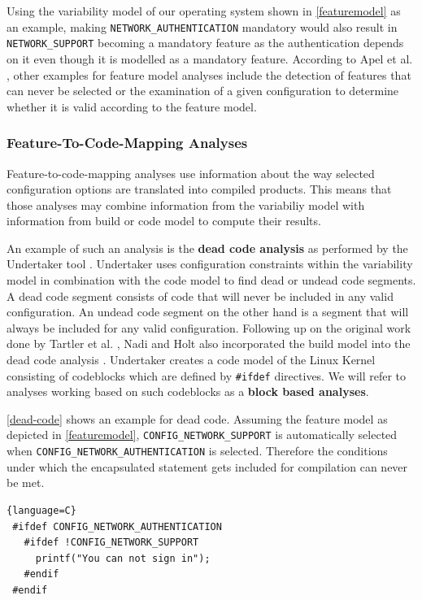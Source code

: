 \documentclass[a4paper]{article}
\begin{document}
Using the variability model of our operating system shown in \autoref{featuremodel} as an example, making \texttt{NETWORK\_AUTHENTICATION} mandatory would also result in \texttt{NETWORK\_SUPPORT} becoming a mandatory feature as the authentication depends on it even though it is modelled as a mandatory feature.  According to Apel et al. \cite{Apel:2013:FSP:2541773}, other examples for feature model analyses include the detection of features that can never be selected or the examination of a given configuration to determine whether it is valid according to the feature model.

\subsubsection{Feature-To-Code-Mapping Analyses}\label{feature-code-mapping}

Feature-to-code-mapping analyses use information about the way selected configuration options are translated into compiled products. This means that those analyses may combine information from the variabiliy model with information from build or code model to compute their results.

An example of such an analysis is the \textbf{dead code analysis} as performed by the Undertaker tool \cite{Tartler:2011:FCC:1966445.1966451}. Undertaker uses configuration constraints within the variability model in combination with the code model to find dead or undead code segments. A dead code segment consists of code that will never be included in any valid configuration. An undead code segment on the other hand is a segment that will always be included for any valid configuration. Following up on the original work done by  Tartler et al. \cite{Tartler:2011:FCC:1966445.1966451}, Nadi and Holt also incorporated the build model into the dead code analysis \cite{mining-kbuild}. Undertaker creates a code model of the Linux Kernel consisting of codeblocks which are defined by \texttt{\#ifdef} directives. We will refer to analyses working based on such codeblocks as a \textbf{block based analyses}.

\autoref{dead-code} shows an example for dead code. Assuming the feature model as depicted in \autoref{featuremodel}, \texttt{CONFIG\_NETWORK\_SUPPORT} is automatically selected when \texttt{CONFIG\_NETWORK\_AUTHENTICATION} is selected. Therefore the conditions under which the encapsulated statement gets included for compilation can never be met.

\begin{lstlisting}[caption=Dead Code, label=dead-code]{language=C}
 #ifdef CONFIG_NETWORK_AUTHENTICATION
   #ifdef !CONFIG_NETWORK_SUPPORT
     printf("You can not sign in");
   #endif
 #endif
\end{lstlisting}
\end{document}

